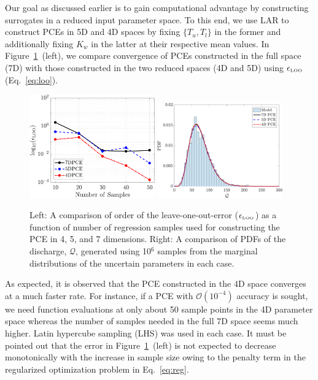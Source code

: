 Our goal as discussed earlier is to gain computational advantage by constructing
surrogates in a reduced input parameter space. To this end, we use LAR to 
construct PCEs
in 5D and 4D spaces by fixing $\{T_u,T_l\}$ in the former and additionally
fixing $K_w$ in the latter at their respective mean values. In
Figure~\ref{fig:conv_bore}~(left), we compare convergence of PCEs constructed in the
full space (7D) with those constructed in the two reduced spaces (4D and 5D)
using $\epsilon_{\mbox{\tiny{LOO}}}$ (Eq.~\ref{eq:loo}). 

\begin{figure}[htbp]
 \begin{center}
  \includegraphics[width=0.48\textwidth]{./Figures/err_samples_borehole}
  \includegraphics[width=0.48\textwidth]{./Figures/pdf_comp_borehole}
\caption{Left: A comparison of order of the leave-one-out-error 
($\epsilon_{\mbox{\tiny{LOO}}}$) as a function of number of regression samples
used for constructing the PCE in 4, 5, and 7 dimensions. Right: A comparison of
PDFs of the discharge, $\mathcal{Q}$, generated using 10$^{6}$ samples from
the marginal distributions of the uncertain parameters in each case.} 
\label{fig:conv_bore}
\end{center}
\end{figure}
%
As expected, it is observed that the PCE constructed in the 4D space converges
at a much faster rate. For instance, if a PCE with $\mathcal{O}(10^{-4})$
accuracy is sought, we need function evaluations at only about 50 sample points
in the 4D parameter space whereas the number of samples needed in the full 7D
space seems much higher. Latin hypercube sampling (LHS) was used in
each case. It must be pointed out that the error in Figure~\ref{fig:conv_bore}~(left)
is not expected to decrease monotonically with the increase in sample size
owing to the penalty term in the regularized optimization problem in Eq.~\ref{eq:reg}. 


